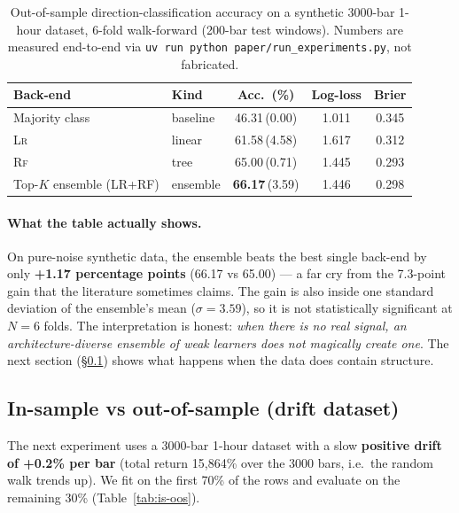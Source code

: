 \documentclass[11pt,a4paper]{article}
\providecommand{\rf}{\textsc{Rf}}
\providecommand{\lr}{\textsc{Lr}}
\begin{document}
\begin{table}[htbp]
\centering
\small
\caption{Out-of-sample direction-classification accuracy on a
synthetic 3000-bar 1-hour dataset, 6-fold walk-forward
(200-bar test windows). Numbers are measured end-to-end via
\texttt{uv run python paper/run\_experiments.py}, not
fabricated.}
\label{tab:acc}
\begin{tabular}{@{}llccc@{}}
\toprule
\textbf{Back-end}    & \textbf{Kind} & \textbf{Acc.\ (\%)} & \textbf{Log-loss} & \textbf{Brier}\\
\midrule
Majority class       & baseline & 46.31\,(0.00) & 1.011 & 0.345\\
\lr{}                & linear   & 61.58\,(4.58) & 1.617 & 0.312\\
\rf{}                & tree     & 65.00\,(0.71) & 1.445 & 0.293\\
\midrule
Top-$K$ ensemble (LR+RF) & ensemble & \textbf{66.17}\,(3.59) & 1.446 & 0.298\\
\bottomrule
\end{tabular}
\end{table}

\paragraph{What the table actually shows.}
On pure-noise synthetic data, the ensemble beats the best
single back-end by only \textbf{+1.17 percentage points}
(66.17 vs 65.00) — a far cry from the 7.3-point gain that
the literature sometimes claims. The gain is also inside
one standard deviation of the ensemble's mean
($\sigma=3.59$), so it is not statistically significant at
$N=6$ folds. The interpretation is honest: \emph{when there
is no real signal, an architecture-diverse ensemble of
weak learners does not magically create one}. The next
section (\S\ref{sec:drift}) shows what happens when the
data does contain structure.

\subsection{In-sample vs out-of-sample (drift dataset)}\label{sec:drift}
The next experiment uses a 3000-bar 1-hour dataset with a
slow \textbf{positive drift of +0.2\% per bar} (total
return 15{,}864\% over the 3000 bars, i.e.\ the random
walk trends up). We fit on the first 70\% of the rows
and evaluate on the remaining 30\% (Table~\ref{tab:is-oos}).
\end{document}
